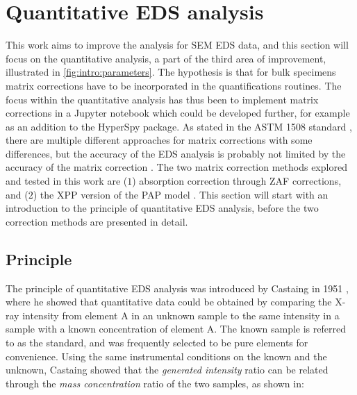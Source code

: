 \section{Quantitative EDS analysis}
\label{theory:quantitative}

This work aims to improve the analysis for SEM EDS data, and this section will focus on the quantitative analysis, a part of the third area of improvement, illustrated in \cref{fig:intro:parameters}.
The hypothesis is that for bulk specimens matrix corrections have to be incorporated in the quantifications routines.
The focus within the quantitative analysis has thus been to implement matrix corrections in a Jupyter notebook which could be developed further, for example as an addition to the HyperSpy package.
As stated in the ASTM 1508 standard \cite{astm_e1508_eds_quantification}, there are multiple different approaches for matrix corrections with some differences, but the accuracy of the EDS analysis is probably not limited by the accuracy of the matrix correction \cite{astm_e1508_eds_quantification}.
The two matrix correction methods explored and tested in this work are ($1$) absorption correction through ZAF corrections, and ($2$) the XPP version of the PAP model \cite{pap_1991}.
This section will start with an introduction to the principle of quantitative EDS analysis, before the two correction methods are presented in detail.






\subsection{Principle}
\label{theory:quantitative:principle}

The principle of quantitative EDS analysis was introduced by Castaing in 1951 \cite{castaing_1951}, where he showed that quantitative data could be obtained by comparing the X-ray intensity from element A in an unknown sample to the same intensity in a sample with a known concentration of element A.
The known sample is referred to as the standard, and was frequently selected to be pure elements for convenience.
Using the same instrumental conditions on the known and the unknown, Castaing showed that the \emph{generated intensity} ratio can be related through the \emph{mass concentration} ratio of the two samples, as shown in:


